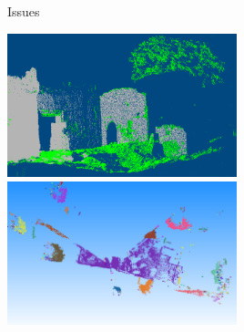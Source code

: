 \documentclass{beamer}
\begin{document}
\begin{frame}{Issues}

\includegraphics[width=0.50\textwidth]{pics/vrmesh-veg.png}
\includegraphics[width=0.50\textwidth]{pics/clustering.png}



\end{frame}
\end{document}
